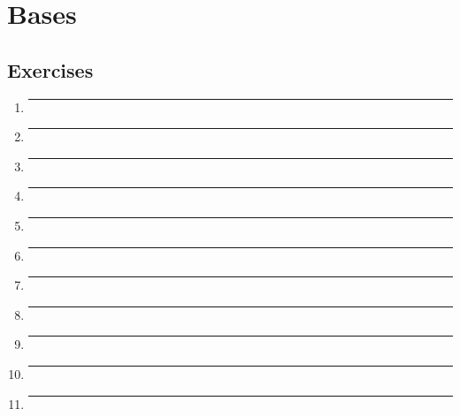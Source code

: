 \section*{Bases}
\subsection*{Exercises}

\begin{enumerate}[label=\textbf{\arabic*}]

  \item{
    \label{E2B-1}
    \lipsum[66]
    \bigbreak
    \hrule
    \bigbreak
  }

  \item{
    \lipsum[75]
    \bigbreak
    \hrule
    \bigbreak
  }

  \item{
    \lipsum[74]
    \bigbreak
    \hrule
    \bigbreak
  }

  \item{
    \lipsum[28]
    \bigbreak
    \hrule
    \bigbreak
  }

  \item{
    \lipsum[32]
    \bigbreak
    \hrule
    \bigbreak
  }

  \item{
    \lipsum[27]
    \bigbreak
    \hrule
    \bigbreak
  }

  \item{
    \lipsum[4]
    \bigbreak
    \hrule
    \bigbreak
  }

  \item{
    \lipsum[17]
    \bigbreak
    \hrule
    \bigbreak
  }

  \item{
    \lipsum[6]
    \bigbreak
    \hrule
    \bigbreak
  }

  \item{
    \lipsum[43]
    \bigbreak
    \hrule
    \bigbreak
  }

  \item{
    \lipsum[56]
    \bigbreak
    \hrule
    \bigbreak
  }

\end{enumerate}